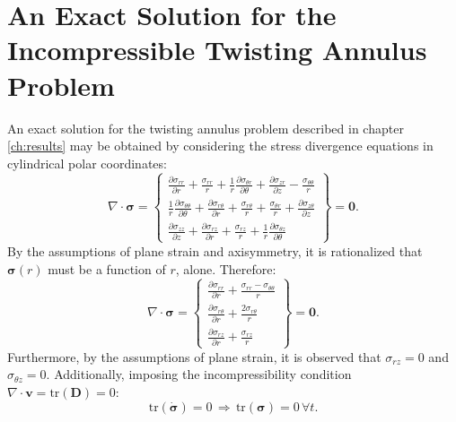 \chapter{An Exact Solution for the Incompressible Twisting Annulus Problem}

An exact solution for the twisting annulus problem described in chapter \ref{ch:results} may be obtained by considering the stress divergence equations in cylindrical polar coordinates:
\begin{equation}
  \nabla \cdot \boldsymbol{\sigma} = \left\{ \begin{array}{c} \frac{\partial \sigma_{rr}}{\partial r} + \frac{\sigma_{rr}}{r} + \frac{1}{r} \frac{\partial \sigma_{\theta r}}{\partial \theta} + \frac{\partial \sigma_{z r}}{\partial z} - \frac{\sigma_{\theta \theta}}{r} \\
    \frac{1}{r} \frac{\partial \sigma_{\theta \theta}}{\partial \theta} + \frac{\partial \sigma_{r\theta}}{\partial r} + \frac{\sigma_{r\theta}}{r} + \frac{\sigma_{\theta r}}{r} + \frac{\partial \sigma_{z \theta}}{\partial z} \\
    \frac{\partial \sigma_{z z}}{\partial z} + \frac{\partial \sigma_{r z}}{\partial r} + \frac{\sigma_{r z}}{r} + \frac{1}{r} \frac{\partial \sigma_{\theta z}}{\partial \theta} \end{array} \right\} = \mathbf{0}.
\end{equation}
By the assumptions of plane strain and axisymmetry, it is rationalized that $\boldsymbol{\sigma} (r)$ must be a function of $r$, alone. Therefore:
\begin{equation}
  \nabla \cdot \boldsymbol{\sigma} = \left\{ \begin{array}{c} \frac{\partial \sigma_{rr}}{\partial r} + \frac{\sigma_{rr} - \sigma_{\theta \theta}}{r} \\
    \frac{\partial \sigma_{r\theta}}{\partial r} + \frac{2 \sigma_{r\theta}}{r} \\
    \frac{\partial \sigma_{r z}}{\partial r} + \frac{\sigma_{r z}}{r} \end{array} \right\} = \mathbf{0}.
\end{equation}
Furthermore, by the assumptions of plane strain, it is observed that $\sigma_{rz} = 0$ and $\sigma_{\theta z} = 0$. Additionally, imposing the incompressibility condition $\nabla \cdot \mathbf{v} = \text{tr} (\mathbf{D}) = 0$:
\begin{equation}
  \text{tr} (\dot{\boldsymbol{\sigma}}) = 0 \, \Rightarrow \, \text{tr} (\boldsymbol{\sigma}) = 0 \, \forall t.
\end{equation}
